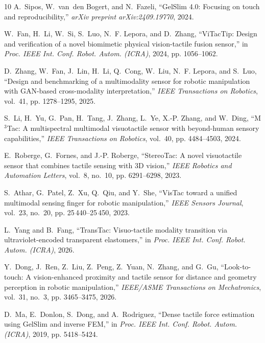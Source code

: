 \documentclass[letterpaper,10pt,conference]{ieeeconf}
\begin{document}
\begin{thebibliography}{10}
A.~Sipos, W.~van~den Bogert, and N.~Fazeli, ``{GelSlim} 4.0: Focusing on touch
  and reproducibility,'' \emph{arXiv preprint arXiv:2409.19770}, 2024.

W.~Fan, H.~Li, W.~Si, S.~Luo, N.~F. Lepora, and D.~Zhang,
  ``{ViTacTip}: Design and verification of a novel biomimetic physical
  vision-tactile fusion sensor,'' in \emph{Proc. IEEE Int. Conf. Robot. Autom. (ICRA)}, 2024, pp. 1056--1062.

D.~Zhang, W.~Fan, J.~Lin, H.~Li, Q.~Cong, W.~Liu, N.~F. Lepora, and S.~Luo,
  ``Design and benchmarking of a multimodality sensor for robotic manipulation
  with {GAN}-based cross-modality interpretation,'' \emph{IEEE Transactions on
  Robotics}, vol.~41, pp. 1278--1295, 2025. 


S.~Li, H.~Yu, G.~Pan, H.~Tang, J.~Zhang, L.~Ye, X.-P. Zhang, and W.~Ding,
  ``{M$^3$Tac}: A multispectral multimodal visuotactile sensor with
  beyond-human sensory capabilities,'' \emph{IEEE Transactions on Robotics},
  vol.~40, pp. 4484--4503, 2024.

E.~Roberge, G.~Fornes, and J.-P. Roberge, ``{StereoTac}: A novel visuotactile
  sensor that combines tactile sensing with {3D} vision,'' \emph{IEEE Robotics
  and Automation Letters}, vol.~8, no.~10, pp. 6291--6298, 2023.

S.~Athar, G.~Patel, Z.~Xu, Q.~Qiu, and Y.~She, ``{VisTac} toward a unified
  multimodal sensing finger for robotic manipulation,'' \emph{IEEE Sensors
  Journal}, vol.~23, no.~20, pp. 25\,440--25\,450, 2023.

L.~Yang and B.~Fang, ``{TransTac}: Visuo-tactile modality transition via
  ultraviolet-encoded transparent elastomers,'' in \emph{Proc. IEEE Int.
  Conf. Robot. Autom. (ICRA)}, 2026.

Y.~Dong, J.~Ren, Z.~Liu, Z.~Peng, Z.~Yuan, N.~Zhang, and G.~Gu,
  ``Look-to-touch: A vision-enhanced proximity and tactile sensor for
  distance and geometry perception in robotic manipulation,''
  \emph{IEEE/ASME Transactions on Mechatronics}, vol.~31, no.~3,
  pp. 3465--3475, 2026.

D.~Ma, E.~Donlon, S.~Dong, and A.~Rodriguez, ``Dense tactile force estimation
  using {GelSlim} and inverse {FEM},'' in \emph{Proc. IEEE Int. Conf. Robot. Autom. (ICRA)}, 2019, pp. 5418--5424.


\end{thebibliography}
\end{document}
